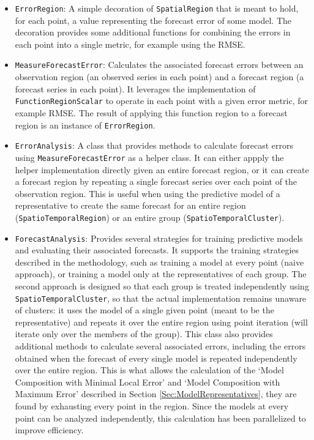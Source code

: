 \begin{itemize}
	\item \texttt{ErrorRegion}: A simple decoration of \texttt{SpatialRegion} that is meant to hold, for each point, a value representing the forecast error of some model. The decoration provides some additional functions for combining the errors in each point into a single metric, for example using the RMSE.
	
	\item \texttt{MeasureForecastError}: Calculates the associated forecast errors between an observation region (an observed series in each point) and a forecast region (a forecast series in each point). It leverages the implementation of \texttt{FunctionRegionScalar} to operate in each point with a given error metric, for example RMSE. The result of applying this function region to a forecast region is an instance of \texttt{ErrorRegion}.
	
	\item \texttt{ErrorAnalysis}: A class that provides methods to calculate forecast errors using \texttt{MeasureForecastError} as a helper class. It can either appply the helper implementation directly given an entire forecast region, or it can create a forecast region by repeating a single forecast series over each point of the observation region. This is useful when using the predictive model of a representative to create the same forecast for an entire region (\texttt{SpatioTemporalRegion}) or an entire group (\texttt{SpatioTemporalCluster}).
	
	\item \texttt{ForecastAnalysis}: Provides several strategies for training predictive models and evaluating their associated forecasts. It supports the training strategies described in the methodology, such as training a model at every point (naive approach), or training a model only at the representatives of each group. The second approach is designed so that each group is treated independently using \texttt{SpatioTemporalCluster}, so that the actual implementation remains unaware of clusters: it uses the model of a single given point (meant to be the representative) and repeats it over the entire region using point iteration (will iterate only over the members of the group). This class also provides additional methods to calculate several associated errors, including the errors obtained when the forecast of every single model is repeated independently over the entire region. This is what allows the calculation of the `Model Composition with Minimal Local Error' and `Model Composition with Maximum Error' described in Section \ref{Sec:ModelRepresentatives}, they are found by exhausting every point in the region. Since the models at every point can be analyzed independently, this calculation has been parallelized to improve efficiency.
\end{itemize}

